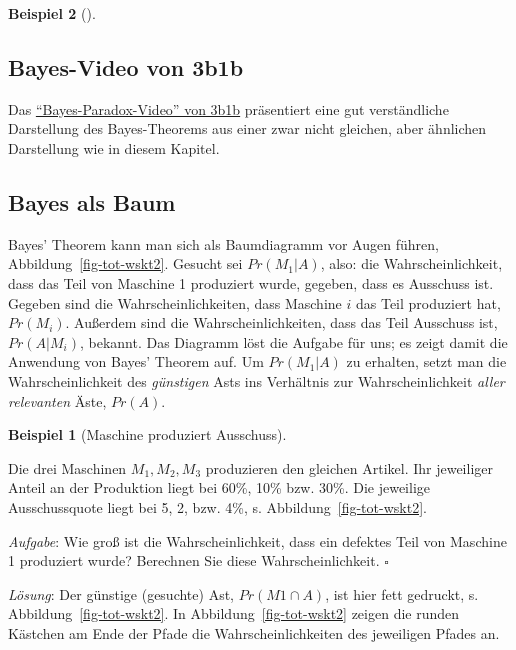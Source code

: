 \documentclass[
  ngerman,
  letterpaper,
  twoside,
  open=any]{scrbook}
\theoremstyle{definition}
\newtheorem{example}{Beispiel}[chapter]
\theoremstyle{plain}
\theoremstyle{definition}
\theoremstyle{definition}
\theoremstyle{remark}
\begin{document}
\begin{example}[]
\subsection{Bayes-Video von 3b1b}\label{bayes-video-von-3b1b}

Das \href{https://youtu.be/lG4VkPoG3ko}{\enquote{Bayes-Paradox-Video}
von 3b1b} präsentiert eine gut verständliche Darstellung des
Bayes-Theorems aus einer zwar nicht gleichen, aber ähnlichen Darstellung
wie in diesem Kapitel.

\subsection{Bayes als Baum}\label{bayes-als-baum}

Bayes' Theorem kann man sich als Baumdiagramm vor Augen führen,
Abbildung~\ref{fig-tot-wskt2}. Gesucht sei \(Pr(M_1|A)\), also: die
Wahrscheinlichkeit, dass das Teil von Maschine 1 produziert wurde,
gegeben, dass es Ausschuss ist. Gegeben sind die Wahrscheinlichkeiten,
dass Maschine \(i\) das Teil produziert hat, \(Pr(M_i)\). Außerdem sind
die Wahrscheinlichkeiten, dass das Teil Ausschuss ist, \(Pr(A|M_i)\),
bekannt. Das Diagramm löst die Aufgabe für uns; es zeigt damit die
Anwendung von Bayes' Theorem auf. Um \(Pr(M_1|A)\) zu erhalten, setzt
man die Wahrscheinlichkeit des \emph{günstigen} Asts ins Verhältnis zur
Wahrscheinlichkeit \emph{aller relevanten} Äste, \(Pr(A)\).

\begin{example}[Maschine produziert
Ausschuss]\protect\hypertarget{exm-bayes1}{}\label{exm-bayes1}

Die drei Maschinen \(M_1, M_2, M_3\) produzieren den gleichen Artikel.
Ihr jeweiliger Anteil an der Produktion liegt bei 60\%, 10\% bzw. 30\%.
Die jeweilige Ausschussquote liegt bei 5, 2, bzw. 4\%, s.
Abbildung~\ref{fig-tot-wskt2}.

\emph{Aufgabe}: Wie groß ist die Wahrscheinlichkeit, dass ein defektes
Teil von Maschine 1 produziert wurde? Berechnen Sie diese
Wahrscheinlichkeit. \(\square\)

\end{example}

\emph{Lösung}: Der günstige (gesuchte) Ast, \(Pr(M1 \cap A)\), ist hier
fett gedruckt, s. Abbildung~\ref{fig-tot-wskt2}. In
Abbildung~\ref{fig-tot-wskt2} zeigen die runden Kästchen am Ende der
Pfade die Wahrscheinlichkeiten des jeweiligen Pfades an.

\begin{figure}[H]


\end{figure}
\end{example}
\end{document}
